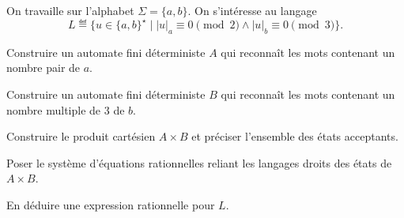 
\begingroup

\begin{exercice}\label{exo:lexing/kleene/challenge}

  On travaille sur l’alphabet $\Sigma=\{a,b\}$. On s’intéresse au langage
  $$
  L \eqdef \{ u\in\{a,b\}^\star \mid |u|_a \equiv 0 \pmod 2 \land |u|_b \equiv 0 \pmod 3 \}.
  $$

  \begin{questions}
  \item Construire un automate fini déterministe $A$ qui reconnaît les mots contenant un nombre pair de $a$.
  \item Construire un automate fini déterministe $B$ qui reconnaît les mots contenant un nombre multiple de $3$ de $b$.
  \item Construire le produit cartésien $A \times B$ et préciser l'ensemble des états acceptants.
  \item Poser le système d'équations rationnelles reliant les langages droits des états de $A \times B$.
  \item En déduire une expression rationnelle pour $L$.
  \end{questions}

\end{exercice}

